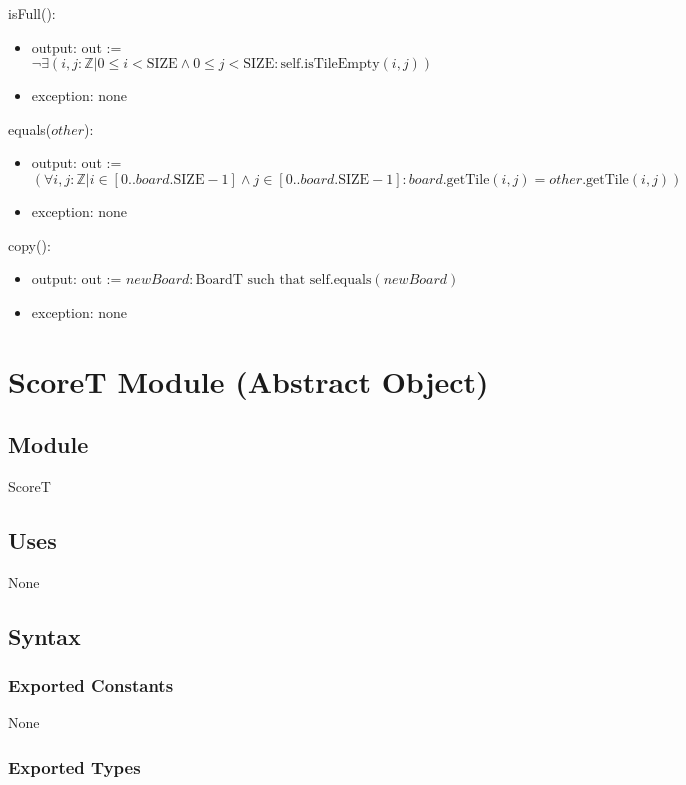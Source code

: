 \documentclass[12pt]{article}
\begin{document}
\noindent isFull():
\begin{itemize}
\item output: out := $\neg \exists ( i, j : \mathbb{Z} | 0 \leq i < \mbox{SIZE} \wedge 0 \leq j < \mbox{SIZE}: \text{self.isTileEmpty}(i, j)) $
\item exception: none
\end{itemize}

\noindent equals($other$):
\begin{itemize}
\item output: out := $(\forall i, j : \mathbb{Z} | i \in [0..board.\text{SIZE} -1] \wedge j \in [0..board.\text{SIZE} -1] : board.\text{getTile}(i,j) = other.\text{getTile}(i,j))$ 
\item exception: none
\end{itemize}

\noindent copy():
\begin{itemize}
\item output: out := $newBoard : \text{BoardT} \text{ such that } \text{self.equals}(newBoard)$ 
\item exception: none
\end{itemize}

\newpage

\section* {ScoreT Module (Abstract Object)}

\subsection*{Module}

ScoreT

\subsection* {Uses}

None

\subsection* {Syntax}

\subsubsection* {Exported Constants}

None

\subsubsection* {Exported Types}
\end{document}
